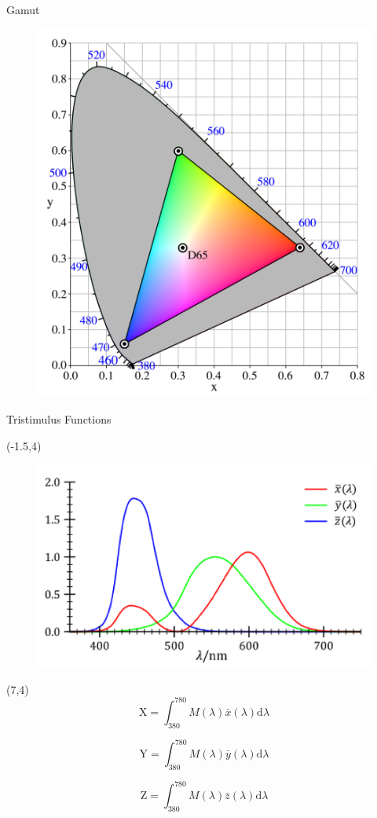 \documentclass{beamer}
\begin{document}
\begin{frame}{Gamut}
\begin{figure}
\centering
\label{fig:8_CIExy1931_sRGB_gamut_D65}
\includegraphics[width=0.55\linewidth]{./8_CIExy1931_sRGB_gamut_D65}
\end{figure}
\end{frame}

\begin{frame}{Tristimulus Functions}



\begin{textblock}{12}(-1.5,4)
\begin{figure}
\centering
\includegraphics[width=0.7\linewidth]{./match_fun}
\label{fig:446px-CIE_1931_XYZ_Color_Matching_Functions}
\end{figure}
\end{textblock}


\begin{textblock}{8}(7,4)
\begin{equation}
\mathrm{X} = \int_{380}^{780} M(\lambda) \bar{x}(\lambda) \mathrm{d} \lambda
\end{equation}

\begin{equation}
\mathrm{Y} = \int_{380}^{780} M(\lambda) \bar{y}(\lambda) \mathrm{d} \lambda
\end{equation}

\begin{equation}
\mathrm{Z} = \int_{380}^{780} M(\lambda) \bar{z}(\lambda) \mathrm{d} \lambda
\end{equation}
\end{textblock}

\end{frame}
\end{document}
